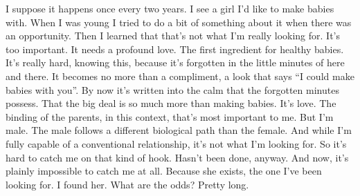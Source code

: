 

I suppose it happens once every two years.  I see a girl I'd like to
make babies with.  When I was young I tried to do a bit of something
about it when there was an opportunity.  Then I learned that that's
not what I'm really looking for.  It's too important.  It needs a
profound love.  The first ingredient for healthy babies.  It's really
hard, knowing this, because it's forgotten in the little minutes of
here and there.  It becomes no more than a compliment, a look that
says ``I could make babies with you''.  By now it's written into the
calm that the forgotten minutes possess.  That the big deal is so much
more than making babies.  It's love.  The binding of the parents, in
this context, that's most important to me.  But I'm male.  The male
follows a different biological path than the female.  And while I'm
fully capable of a conventional relationship, it's not what I'm
looking for.  So it's hard to catch me on that kind of hook.  Hasn't
been done, anyway.  And now, it's plainly impossible to catch me at
all.  Because she exists, the one I've been looking for.  I found her.
What are the odds?  Pretty long.

\bye
